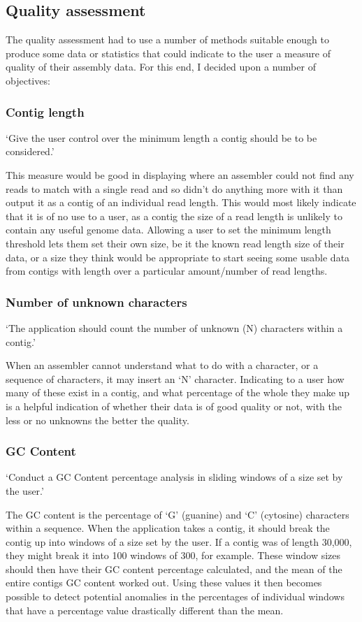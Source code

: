 \subsection{Quality assessment}
The quality assessment had to use a number of methods suitable enough to produce some data or statistics that could indicate to the user a measure of quality of their assembly data. For this end, I decided upon a number of objectives:

\subsubsection{Contig length}
`Give the user control over the minimum length a contig should be to be considered.'

This measure would be good in displaying where an assembler could not find any reads to match with a single read and so didn't do anything more with it than output it as a contig of an individual read length. This would most likely indicate that it is of no use to a user, as a contig the size of a read length is unlikely to contain any useful genome data. Allowing a user to set the minimum length threshold lets them set their own size, be it the known read length size of their data, or a size they think would be appropriate to start seeing some usable data from contigs with length over a particular amount/number of read lengths.

\subsubsection{Number of unknown characters}
`The application should count the number of unknown (N) characters within a contig.'

When an assembler cannot understand what to do with a character, or a sequence of characters, it may insert an `N' character. Indicating to a user how many of these exist in a contig, and what percentage of the whole they make up is a helpful indication of whether their data is of good quality or not, with the less or no unknowns the better the quality.

\subsubsection{GC Content}
`Conduct a GC Content percentage analysis in sliding windows of a size set by the user.'

The GC content is the percentage of `G' (guanine) and `C' (cytosine) characters within a sequence\cite{citeulike:14021291}. When the application takes a contig, it should break the contig up into windows of a size set by the user. If a contig was of length 30,000, they might break it into 100 windows of 300, for example. These window sizes should then have their GC content percentage calculated, and the mean of the entire contigs GC content worked out. Using these values it then becomes possible to detect potential anomalies in the percentages of individual windows that have a percentage value drastically different than the mean.

